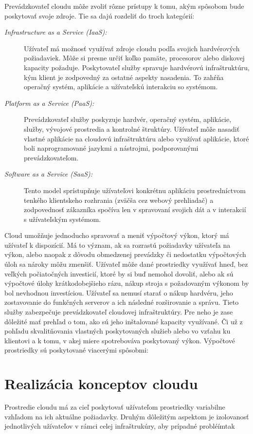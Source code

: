 \documentclass[12pt,twoside,color,cover,table]{fithesis3}
\begin{document}
Prevádzkovateľ cloudu môže zvoliť rôzne prístupy k tomu, akým spôsobom bude poskytovať svoje zdroje. Tie sa dajú rozdeliť do troch kategórií:

\begin{description}
\item[\emph{Infrastructure as a Service (IaaS):}] Užívateľ má možnosť využívať zdroje cloudu podľa svojich hardvérových požiadaviek.
Môže si presne určiť koľko pamäte, procesorov alebo diskovej kapacity požaduje. Poskytovateľ služby spravuje hardvérovú infraštruktúru,
kým klient je zodpovedný za ostatné aspekty nasadenia. To zahŕňa operačný systém, aplikácie a užívateľskú interakciu so systémom. %
\item[\emph{Platform as a Service (PaaS):}] Prevádzkovateľ služby poskyzuje hardvér, operačný systém, aplikácie, služby, vývojové prostredia
a kontrolné štruktúry. Užívateľ môže nasadiť vlastné aplikácie na cloudovú infraštruktúru alebo využívať aplikácie, ktoré boli naprogramované
jazykmi a nástrojmi, podporovanými prevádzkovateľom. %
\item[\emph{Software as a Service (SaaS):}] Tento model sprístupňuje užívateľovi konkrétnu aplikáciu prostredníctvom tenkého klientskeho 
rozhrania (zväčša cez webový prehliadač) a zodpovednosť zákazníka spočíva len v spravovaní svojich dát a v interakcií s užívateľským systémom.%
\end{description}

Cloud umožňuje jednoducho spravovať a meniť výpočtový výkon, ktorý má užívateľ k dispozícií. Má to význam, ak sa rozrastú požiadavky užívateľa na výkon, alebo naopak z dôvodu obmedzenej prevádzky či 
nedostatku výpočtových úloh sa nároky môžu zmenšiť. Užívateľ môže dané prostriedky využívať hneď, bez veľkých počiatočných investicií, ktoré by si buď nemohol dovoliť, alebo ak sú výpočtové úlohy krátkodobejšieho rázu, nákup
stroja s požadovaným výkonom by bol nevhodnou investíciou. Užívateľ sa nemusí starať o nákup hardvéru, jeho zostavovanie do funkčných serverov a ich následné rozširovanie a správu. Tieto služby zabezpečuje prevádzkovateľ cloudovej infraštruktúry.
Pre neho je zase dôležité mať prehľad o tom, ako sú jeho inštalované kapacity využívané. Či už z pohľadu skvalitňovania vlastných poskytovaných služieb alebo vo vzťahu ku klientovi a k tomu, v akej miere spotrebováva poskytovaný výkon.
Výpočtové prostriedky sú poskytované viacerými spôsobmi:

\section{Realizácia konceptov cloudu}
Prostredie cloudu má za cieľ poskytovať užívateľom prostriedky variabilne vzhľadom na ich aktuálne požiadavky. Druhým dôležitým aspektom je
izolovanosť jednotlivých užívateľov v rámci celej infraštrukúry, aby prípadné probléímtak
\end{document}
